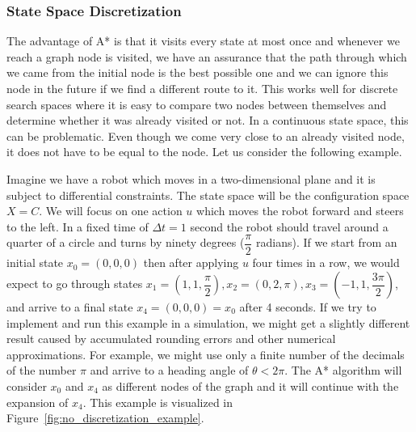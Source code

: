 \subsubsection{State Space Discretization}

The advantage of A* is that it visits every state at most once and whenever we reach a graph node is visited, we have an assurance that the path through which we came from the initial node is the best possible one and we can ignore this node in the future if we find a different route to it. This works well for discrete search spaces where it is easy to compare two nodes between themselves and determine whether it was already visited or not. In a continuous state space, this can be problematic. Even though we come very close to an already visited node, it does not have to be equal to the node. Let us consider the following example.

\begin{example}
	Imagine we have a robot which moves in a two-dimensional plane and it is subject to differential constraints. The state space will be the configuration space $X=C$. We will focus on one action $u$ which moves the robot forward and steers to the left. In a fixed time of $\Delta t=1$ second the robot should travel around a quarter of a circle and turns by ninety degrees ($\dfrac{\pi}{2}$ radians). If we start from an initial state $x_0=\left(0,0,0\right)$ then after applying $u$ four times in a row, we would expect to go through states $x_1=\left(1,1,\dfrac{\pi}{2}\right),x_2=\left(0,2,\pi\right),x_3=\left(-1,1,\dfrac{3\pi}{2}\right)$, and arrive to a final state $x_4=\left(0,0,0\right)=x_0$ after 4 seconds. If we try to implement and run this example in a simulation, we might get a slightly different result caused by accumulated rounding errors and other numerical approximations. For example, we might use only a finite number of the decimals of the number $\pi$ and arrive to a heading angle of $\theta<2\pi$. The A* algorithm will consider $x_0$ and $x_4$ as different nodes of the graph and it will continue with the expansion of $x_4$. This example is visualized in Figure~\ref{fig:no_discretization_example}.
\end{example}

